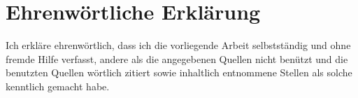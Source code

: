 \documentclass[
  headexclude,
  footexclude,
  10pt,
  a4paper,
  oneside,
  captions=tableheading,
  bibliography=totoc,
  listof=totoc
]{scrbook}
\renewcommand*{\maketitle}{
  \clearpage
  \thispagestyle{empty}
  \null
  \begin{center}
    {\textbf{\campusSubject} \par}
    \vskip 2.5em
    {\hrule\vskip 2em \titlefont\huge\campusTitle\vspace*{1em}\hrule\vspace*{1.5em}\par}
    {accomplished at \par}
    \vskip .6em
    {\parbox[c]{6.6cm}{\texttt{[image: images/Campus02\_Logo.pdf]}} \par}
    \vskip .1em
    {FACHHOCHSCHULE DER WIRTSCHAFT \par}
    \vskip 2em
    {Bachelor Degree Programme \\ Innovation Management \par}
    \vskip 2em
    {by \\ {\Large \textbf{\campusAuthor}} \\ \campusPersKnz \par}
    \vskip 2em
    {supervised and reviewed by \par}
    {\normalsize Dipl.-Ing. Johann Johannes \\ FH-Prof. Dipl.-Ing. Dr.techn. Michael Terler \par}
    \vfill
    {
      \begin{flushleft}
        \hfill\parbox[c]{7.3cm}{\texttt{[image: images/Placeholder]}}
        \begin{tabular}{lclcl}
          {\campusCity, \campusDate} & ~\hfill & \hspace*{3cm} & ~\hfill &  \underline{\hspace*{5cm}} \\
          ~\hfill & ~ &   & ~ &  \multicolumn{1}{c}{Signature}   \\
        \end{tabular}
      \end{flushleft}
    }
  \end{center}
  \par
}
\begin{document}
\frontmatter

\renewcommand*{\chapterpagestyle}{scrplain}
\pagestyle{scrplain}

\sloppy

\begin{titlepage}

\subject{\campusSubject}
\title{\campusTitle}

\author{\bfseries \campusAuthor}
\date{\campusCity, \campusDate}

\maketitle

\end{titlepage}
\newpage

\chapter*{Ehrenwörtliche Erklärung}

\begin{otherlanguage}{austrian}
Ich erkläre ehrenwörtlich, dass ich die vorliegende Arbeit selbstständig und ohne fremde Hilfe verfasst, andere als die angegebenen Quellen nicht benützt und die benutzten Quellen wörtlich zitiert sowie inhaltlich entnommene Stellen als solche kenntlich gemacht habe.
\end{otherlanguage}

{
}


\end{document}
